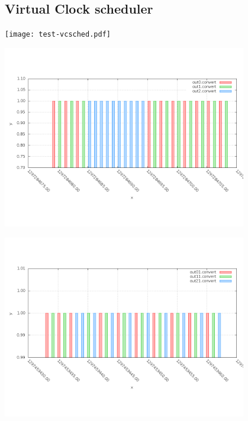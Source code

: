 \documentclass[a4paper]{article}
\begin{document}
  \subsection{Virtual Clock scheduler}
  \begin{center}
	\texttt{[image: test-vcsched.pdf]}
	\label{fig:vcsched}
  \end{center}
 
  \begin{center}
	\includegraphics[width=0.80\textwidth]{vcs-dense.png}
	\label{fig:test-vcs}
  \end{center}
 
  \begin{center}
	\includegraphics[width=0.80\textwidth]{vcs1-dense.png}
	\label{fig:test-vcs1}
  \end{center}
  
\end{document}
